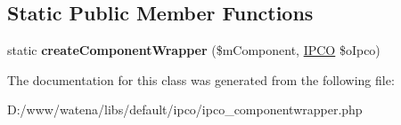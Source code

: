 \subsection*{Static Public Member Functions}
\begin{DoxyCompactItemize}
\item 
\hypertarget{class_i_p_c_o___component_wrapper_abb804c124fc807390ca8b1cf5aa999a1}{static {\bfseries create\-Component\-Wrapper} (\$m\-Component, \hyperlink{class_i_p_c_o}{I\-P\-C\-O} \$o\-Ipco)}\label{class_i_p_c_o___component_wrapper_abb804c124fc807390ca8b1cf5aa999a1}

\end{DoxyCompactItemize}


The documentation for this class was generated from the following file\-:\begin{DoxyCompactItemize}
\item 
D\-:/www/watena/libs/default/ipco/ipco\-\_\-componentwrapper.\-php\end{DoxyCompactItemize}
